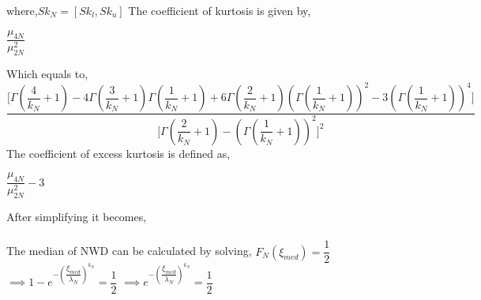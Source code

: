 \documentclass[12pt,a4paper,oneside]{article}
\begin{document}
\vspace*{2cm}where,$\boxed{Sk_{N}=[Sk_{l},Sk_{u}]}$\newline\newline
The coefficient of kurtosis is given by,\\
\begin{center}
$\dfrac{{\mu}_{4N}}{{\mu}_{2N}^{2}}$
\end{center}
Which equals to,\\
$\dfrac{\Biggl[\Gamma\left(\dfrac{4}{k_{N}}+1\right)-4\Gamma\left(\dfrac{3}{k_{N}}+1\right)\Gamma\left(\dfrac{1}{k_{N}}+1\right)+6\Gamma\left(\dfrac{2}{k_{N}}+1\right)\left(\Gamma\left(\dfrac{1}{k_{N}}+1\right)\right)^{2}-3\left(\Gamma\left(\dfrac{1}{k_{N}}+1\right)\right)^{4}\Biggr]}{\Biggl[\Gamma\left(\dfrac{2}{k_{N}}+1\right)-{\left(\Gamma\left(\dfrac{1}{k_{N}}+1\right)\right)^{2}}\Biggr]^{2}}$\\
The coefficient of excess kurtosis is defined as,\\
\begin{center}
$\dfrac{{\mu}_{4N}}{{\mu}_{2N}^{2}}-3$
\end{center}
After simplifying it becomes,\\
\\
\newpage
The median of NWD can be calculated by solving,\newline\newline\newline
\hspace*{5cm}$F_{N}(\xi_{med})=\dfrac{1}{2}$\newline\newline\newline
\hspace*{4cm}$\implies 1-e^{-\left(\dfrac{\xi_{med}}{\lambda_{N}}\right)^{k_{N}}}=\dfrac{1}{2}$\newline\newline\newline
\hspace*{4cm}$\implies e^{-\left(\dfrac{\xi_{med}}{\lambda_{N}}\right)^{k_{N}}}=\dfrac{1}{2}$\newline\newline
\end{document}

